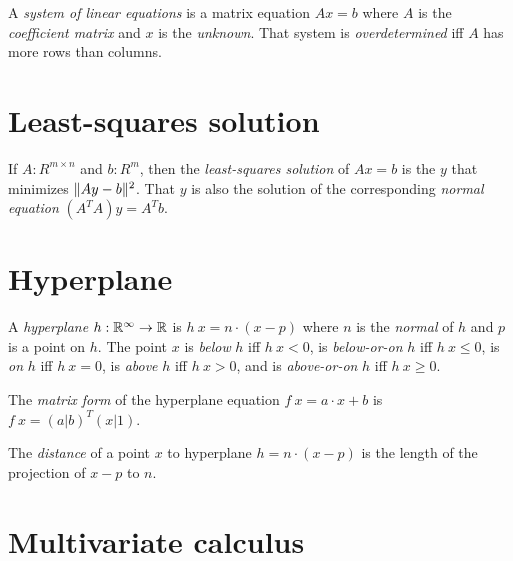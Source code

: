 %
%
%
%
A \emph{system of linear equations} is a matrix equation \(A x = b\)
where \(A\) is the \emph{coefficient matrix} and \(x\) is the \emph{unknown}.
%
%
That system is \emph{overdetermined} iff \(A\) has more rows than columns.

\section{Least-squares solution}

%
%
%
If \(A : R^{m \times n}\) and \(b : R^m\),
then the \emph{least-squares solution} of \(A x = b\)
is the \(y\) that minimizes \(\lVert A y - b\rVert^2\).
%
That \(y\) is also the solution of the corresponding \emph{normal equation}
\((A^T A) y = A^T b\).

\section{Hyperplane}

%
%
%
%
%
%
A \emph{hyperplane}
\(h : \mathbb{R}^\infty \to \mathbb{R}\)
is \(h~x = n \cdot (x - p)\)
where \(n\) is the \emph{normal} of \(h\)
and \(p\) is a point on \(h\).
The point \(x\)
is \emph{below} \(h\) iff \( h~x < 0 \),
is \emph{below-or-on} \(h\) iff \( h~x \le 0 \),
is \emph{on} \(h\) iff \( h~x = 0 \),
is \emph{above} \(h\) iff \( h~x > 0 \),
and
is \emph{above-or-on} \(h\) iff \( h~x \ge 0 \).

%
%
The \emph{matrix form} of the hyperplane equation \(f~x = a \cdot x + b\)
is \(f~x = (a|b)^T (x|1)\).

The \emph{distance} of a point \(x\) to hyperplane \(h = n \cdot (x - p)\)
is the length of the projection of \(x-p\) to \(n\).

\section{Multivariate calculus}

